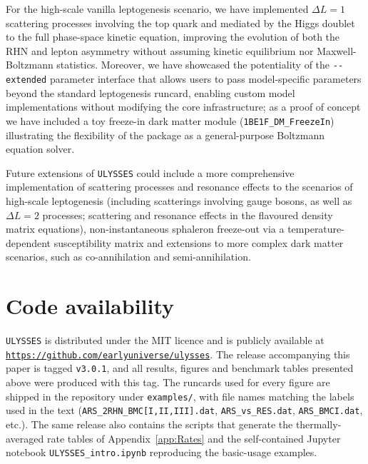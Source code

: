 \documentclass[12pt, a4paper]{article}
\begin{document}
For the high-scale vanilla leptogenesis scenario, we have implemented $\Delta L = 1$ scattering processes involving the top quark and mediated by the Higgs doublet to the full phase-space kinetic equation, improving the evolution of both the RHN and lepton asymmetry without assuming kinetic equilibrium nor Maxwell-Boltzmann statistics. Moreover, we have showcased the potentiality of the \texttt{-{}-extended} parameter interface that allows users to pass model-specific parameters beyond the standard leptogenesis runcard, enabling custom model implementations without modifying the core infrastructure; as a proof of concept we have included a toy freeze-in dark matter module (\texttt{1BE1F\_DM\_FreezeIn}) illustrating the flexibility of the package as a general-purpose Boltzmann equation solver.

Future extensions of \texttt{ULYSSES} could include a more comprehensive implementation of scattering processes and resonance effects to the scenarios of high-scale leptogenesis (including scatterings involving gauge bosons, as well as $\Delta L = 2$ processes; scattering and resonance effects in the flavoured density matrix equations), non-instantaneous sphaleron freeze-out via a temperature-dependent susceptibility matrix and extensions to more complex dark matter scenarios, such as co-annihilation and semi-annihilation.


\section*{Code availability}
\texttt{ULYSSES} is distributed under the MIT licence and is publicly available at
\href{https://github.com/earlyuniverse/ulysses}{\texttt{https://github.com/earlyuniverse/ulysses}}.
The release accompanying this paper is tagged \texttt{v3.0.1}, and all results, figures and benchmark tables presented above were produced with this tag. The runcards used for every figure are shipped in the repository under \texttt{examples/}, with file names matching the labels used in the text (\texttt{ARS\_2RHN\_BMC[I,II,III].dat}, \texttt{ARS\_vs\_RES.dat}, \texttt{ARS\_BMCI.dat}, etc.). The same release also contains the scripts that generate the thermally-averaged rate tables of Appendix~\ref{app:Rates} and the self-contained Jupyter notebook \texttt{ULYSSES\_intro.ipynb} reproducing the basic-usage examples.
\end{document}
